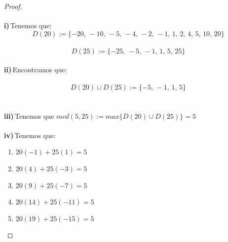 \documentclass[11pt,letterpaper]{article}
\newcommand{\Z}{\mathbb{Z}}
\begin{document}
\,\\
\,\\
\begin{proof}\,\\
    \,\\
    \textbf{i)}\,Tenemos que:\,\\
    \begin{equation*}
        D(20):=\{-20,\,-10,\,-5,\,-4,\,-2,\,-1,\,1,\,2,\,4,\,5,\,10,\,20\}
    \end{equation*}\,\\
    \begin{equation*}
        D(25):=\{-25,\,-5,\,-1,\,1,\,5,\,25\}
    \end{equation*}\,\\
    \textbf{ii)}\,Encontramos que:\,\\
    \,\\
    \begin{equation*}
        D(20)\cup D(25):=\{-5,\,-1,\,1,\,5\}
    \end{equation*}\,\\
    \,\\
    \textbf{iii)}\,Tenemos que $mcd(5,25):=max\{D(20)\cup D(25)\}=5$\,\\
    \,\\
    \textbf{iv)}\,Tenemos que:
    \begin{enumerate}
        \item $20(-1)+25(1)=5$
        \item $20(4)+25(-3)=5$
        \item $20(9)+25(-7)=5$
        \item $20(14)+25(-11)=5$
        \item $20(19)+25(-15)=5$
    \end{enumerate}

    
\end{proof}\,\\
\end{document}
